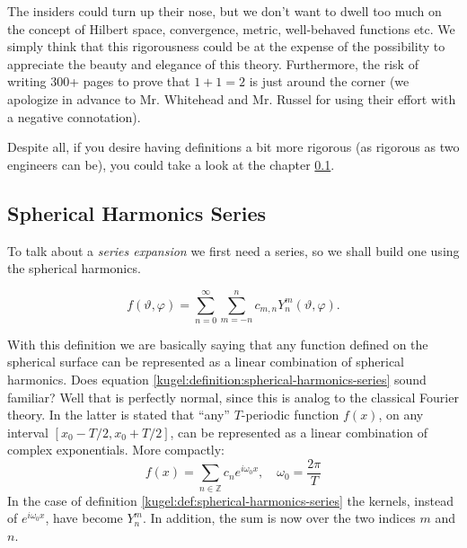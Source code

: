 The insiders could turn up their nose, but we don't want to dwell too much on
the concept of Hilbert space, convergence, metric, well-behaved functions etc.
We simply think that this rigorousness could be at the expense of the
possibility to appreciate the beauty and elegance of this theory.  Furthermore,
the risk of writing 300+ pages to prove that $1+1=2$\cite{principia-mathematica}
is just around the corner (we apologize in advance to Mr. Whitehead and Mr.
Russel for using their effort with a negative connotation).

Despite all, if you desire having definitions a bit more rigorous (as rigorous
as two engineers can be), you could take a look at the chapter \ref{}.

\subsection{Spherical Harmonics Series}

To talk about a \emph{series expansion} we first need a series, so we shall
build one using the spherical harmonics.

\begin{definition}
  \label{kugel:def:spherical-harmonics-series}
  \begin{equation}
    f(\vartheta, \varphi) 
    = \sum_{n=0}^\infty \sum_{m =-n}^n
      c_{m,n} Y^m_n(\vartheta, \varphi).
      \label{kugel:eqn:spherical-harmonics-series}
  \end{equation}
\end{definition}

With this definition we are basically saying that any function defined on the
spherical surface can be represented as a linear combination of spherical
harmonics.  Does equation \eqref{kugel:definition:spherical-harmonics-series}
sound familiar? Well that is perfectly normal, since this is analog to the
classical Fourier theory.  In the latter is stated that ``any'' $T$-periodic
function $f(x)$, on any interval $[x_0-T/2,x_0+T/2]$, can be represented as a
linear combination of complex exponentials. More compactly:
\begin{equation*}
  f(x) = \sum_{n \in \mathbb{Z}} c_n e^{i \omega_0 x},
    \quad \omega_0=\frac{2\pi}{T}
\end{equation*}
In the case of definition \ref{kugel:def:spherical-harmonics-series} the
kernels, instead of $e^{i\omega_0x}$, have become $Y^m_n$. In addition, the sum
is now over the two indices $m$ and $n$.

